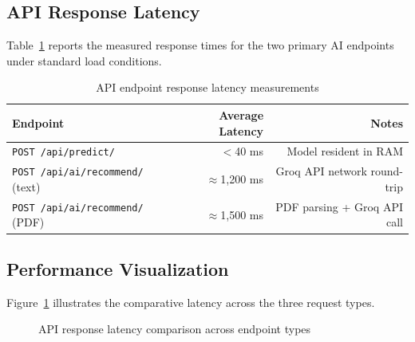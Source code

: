\subsection{API Response Latency}
Table~\ref{tab:latency} reports the measured response times for the two primary AI endpoints under standard load conditions.

\begin{table}[htbp]
\centering
\caption{API endpoint response latency measurements}
\label{tab:latency}
\begin{tabular}{|l|r|r|}
\hline
\textbf{Endpoint} & \textbf{Average Latency} & \textbf{Notes} \\
\hline
\texttt{POST /api/predict/} & $<$40 ms & Model resident in RAM \\
\texttt{POST /api/ai/recommend/} (text) & $\approx$1,200 ms & Groq API network round-trip \\
\texttt{POST /api/ai/recommend/} (PDF) & $\approx$1,500 ms & PDF parsing + Groq API call \\
\hline
\end{tabular}
\end{table}

\subsection{Performance Visualization}

Figure~\ref{fig:latency_bar} illustrates the comparative latency across the three request types.

\begin{figure}[htbp]
\centering
{}
\caption{API response latency comparison across endpoint types}
\label{fig:latency_bar}
\end{figure}

